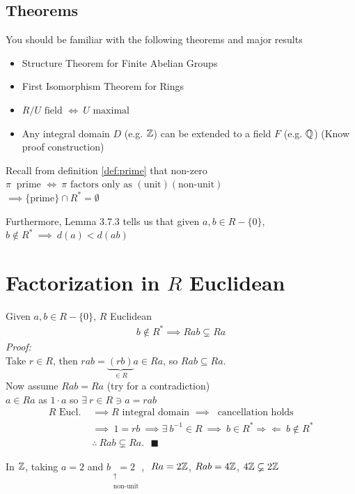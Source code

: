 \subsection*{Theorems}
You should be familiar with the following theorems and major results
\begin{itemize}
    \item Structure Theorem for Finite Abelian Groups
    \item First Isomorphism Theorem for Rings
    \item $R/U \text{ field } \iff \ U \text{ maximal}$
    \item Any integral domain $D$ (e.g. ${\mathbb{ Z}}$) can be extended to a field $F$ (e.g. ${\mathbb{ Q}}$) (Know proof construction)
\end{itemize}
\newpage 

Recall from definition \ref{def:prime} that non-zero $\pi \ \text{ prime }\iff \ \pi \text{ factors only as }(\text{unit})(\text{non-unit})$\\
$\implies \{\text{prime}\}\cap R^*=\emptyset$\\ \steezybreak

Furthermore, Lemma 3.7.3 tells us that given $a,b\in R-\{0\}$, $b\not\in R^* \ \implies \ d(a)<d(ab)$
\section*{Factorization in $R$ Euclidean}
\begin{lemma*}
    Given $a,b\in R-\{0\}$, $R$ Euclidean
    \begin{align*}
        b\not\in R^* \implies Rab \varsubsetneq Ra
    \end{align*}
    \textit{Proof:} \\ \steezybreak
    Take $r\in R$, then $rab = \underbrace{(rb)}_{\in R}a \in Ra$, so $Rab\subseteq Ra$. \\

    \noindent Now assume $Rab=Ra$ (try for a contradiction) \\
    $a\in Ra$ as $1\cdot a$ so $\exists \ r \in R \ni a=rab$
    \begin{align*}
        R \text{ Eucl. } &\implies R \text{ integral domain } \implies \ \text{ cancellation holds } \\
        &\implies \ 1=rb \ \implies \exists \ b^{-1}\in R \ \implies \ b\in R^* \Rightarrow \Leftarrow \ b\not \in R^* \\
        &\therefore \ Rab \varsubsetneq Ra. \ \ \ \blacksquare
    \end{align*}
\end{lemma*}
\begin{example}
    In ${\mathbb{ Z}}$, taking $a=2$ and $b\underset{\substack{\uparrow \\ \text{non-unit}}}{=2}$, $\ Ra=2{\mathbb{ Z}}$, $Rab=4{\mathbb{ Z}}$, $4{\mathbb{ Z}} \varsubsetneq 2{\mathbb{ Z}}$
\end{example}

